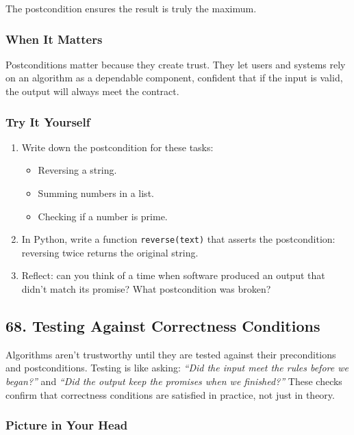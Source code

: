 \documentclass[
  letterpaper,
  DIV=11,
  numbers=noendperiod]{scrreprt}
\providecommand{\tightlist}{%
  \setlength{\itemsep}{0pt}\setlength{\parskip}{0pt}}
\begin{document}
The postcondition ensures the result is truly the maximum.

\subsubsection{When It Matters}\label{when-it-matters-64}

Postconditions matter because they create trust. They let users and
systems rely on an algorithm as a dependable component, confident that
if the input is valid, the output will always meet the contract.

\subsubsection{Try It Yourself}\label{try-it-yourself-66}

\begin{enumerate}
\def\labelenumi{\arabic{enumi}.}
\item
  Write down the postcondition for these tasks:

  \begin{itemize}
  \tightlist
  \item
    Reversing a string.
  \item
    Summing numbers in a list.
  \item
    Checking if a number is prime.
  \end{itemize}
\item
  In Python, write a function \texttt{reverse(text)} that asserts the
  postcondition: reversing twice returns the original string.
\item
  Reflect: can you think of a time when software produced an output that
  didn't match its promise? What postcondition was broken?
\end{enumerate}

\subsection{68. Testing Against Correctness
Conditions}\label{testing-against-correctness-conditions}

Algorithms aren't trustworthy until they are tested against their
preconditions and postconditions. Testing is like asking: \emph{``Did
the input meet the rules before we began?''} and \emph{``Did the output
keep the promises when we finished?''} These checks confirm that
correctness conditions are satisfied in practice, not just in theory.

\subsubsection{Picture in Your Head}\label{picture-in-your-head-67}
\end{document}
